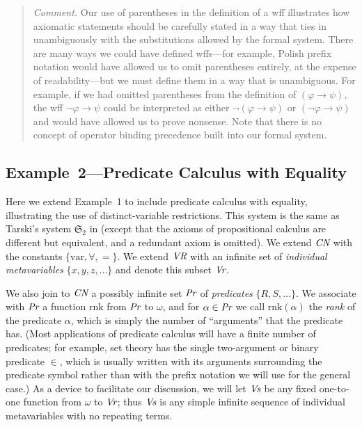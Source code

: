 {\footnotesize\begin{quotation}
{\em Comment.} Our use of parentheses in the definition of a wff illustrates
how axiomatic statements should be carefully stated in a way that
ties in unambiguously with the substitutions allowed by the formal system.
There are many ways we could have defined wffs---for example, Polish
prefix notation would have allowed us to omit parentheses entirely, at
the expense of readability---but we must define them in a way that is
unambiguous.  For example, if we had omitted parentheses from the
definition of $(\varphi\to \psi)$, the wff $\lnot\varphi\to \psi$ could
be interpreted as either $\lnot(\varphi\to\psi)$ or $(\lnot\varphi\to\psi)$
and would have allowed us to prove nonsense.  Note that there is no
concept of operator binding precedence built into our formal system.
\end{quotation}}

\subsection{Example~2---Predicate Calculus with Equality}

Here we extend Example~1 to include predicate calculus with equality,
illustrating the use of distinct-variable restrictions.  This system is the
same as Tarski's system $\mathfrak{S}_2$ in \cite{Tarski1965} (except that the
axioms of propositional calculus are different but equivalent, and a redundant
axiom is omitted).  We extend $\mbox{\em CN}$ with the constants
$\{\mbox{var},\forall,=\}$.  We extend $\mbox{\em VR}$ with an infinite set of
{\em individual metavariables} $\{x,y,z,\ldots\}$ and denote this subset
$\mbox{\em Vr}$.

We also join to $\mbox{\em CN}$ a possibly infinite set $\mbox{\em Pr}$ of {\em
predicates} $\{R,S,\ldots\}$.  We associate with $\mbox{\em Pr}$ a function
$\mbox{rnk}$ from $\mbox{\em Pr}$ to $\omega$, and for $\alpha\in \mbox{\em
Pr}$ we call $\mbox{rnk}(\alpha)$ the {\em rank} of the predicate $\alpha$,
which is simply the number of ``arguments'' that the predicate has.  (Most
applications of predicate calculus will have a finite number of predicates;
for example, set theory has the single two-argument or binary predicate $\in$,
which is usually written with its arguments surrounding the predicate symbol
rather than with the prefix notation we will use for the general case.)  As a
device to facilitate our discussion, we will let $\mbox{\em Vs}$ be any fixed
one-to-one function from $\omega$ to $\mbox{\em Vr}$; thus $\mbox{\em Vs}$ is
any simple infinite sequence of individual metavariables with no repeating
terms.

